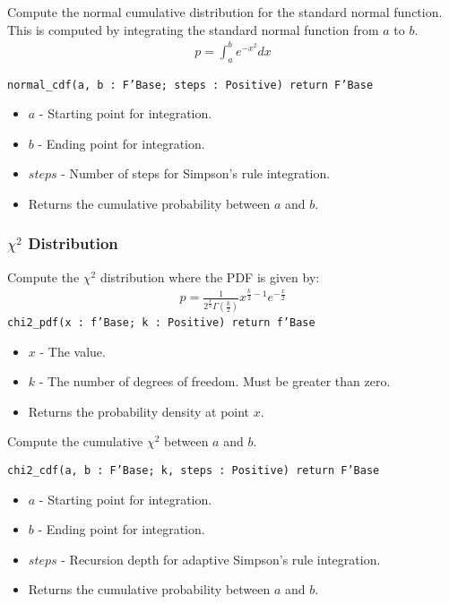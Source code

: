 \documentclass[10pt, openany]{book}
\newcommand{\function}[1]{\texttt{#1}}
\begin{document}
Compute the normal cumulative distribution for the standard normal function.  This is computed by integrating the standard normal function from $a$ to $b$.
\begin{align*}
  p = \int^b_a e^{-x^2} dx
\end{align*}

\function{normal\_cdf(a, b : F'Base; steps : Positive) return F'Base}
\begin{itemize}
  \item $a$ - Starting point for integration.
  \item $b$ - Ending point for integration.
  \item $steps$ - Number of steps for Simpson's rule integration.
  \item Returns the cumulative probability between $a$ and $b$.
\end{itemize}

\subsubsection{$\chi^2$ Distribution}
Compute the $\chi^2$ distribution where the PDF is given by:
\begin{align*}
  p = \frac{1}{2^{\frac{k}{2}}\Gamma(\frac{k}{2})}x^{\frac{k}{2}-1}e^{-\frac{x}{2}}
\end{align*}
\function{chi2\_pdf(x : f'Base; k : Positive) return f'Base}
\begin{itemize}
  \item $x$ - The value.
  \item $k$ - The number of degrees of freedom.  Must be greater than zero.
  \item Returns the probability density at point $x$.
\end{itemize}

Compute the cumulative $\chi^2$ between $a$ and $b$.

\function{chi2\_cdf(a, b : F'Base; k, steps : Positive) return F'Base}
\begin{itemize}
  \item $a$ - Starting point for integration.
  \item $b$ - Ending point for integration.
  \item $steps$ - Recursion depth for adaptive Simpson's rule integration.
  \item Returns the cumulative probability between $a$ and $b$.
\end{itemize}
\end{document}

